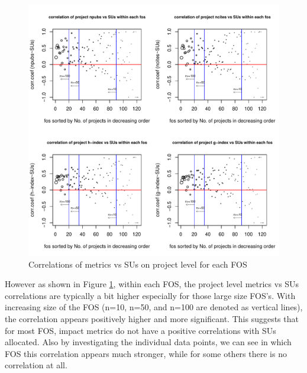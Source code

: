 \documentclass{sig-alternate}
\begin{document}
\begin{figure}[htb] 
  \centering 
    \includegraphics[width=1.0\columnwidth]{images/06_corr_metrics_vs_alloc_proj_by_fos.pdf} 
  \caption{Correlations of metrics vs SUs on project level for each FOS}\label{F:corr-metrics-vs-alloc-proj-by-fos} 
\end{figure} 
 
However as shown in Figure \ref{F:corr-metrics-vs-alloc-proj-by-fos}, within each FOS, the project level metrics vs SUs correlations are typically a bit higher especially for those large size FOS’s. With increasing size of the FOS (n=10, n=50, and n=100 are denoted as vertical lines), the correlation appears positively higher and more significant. This suggests that for most FOS, impact metrics do not have a positive correlations with SUs allocated. Also by investigating the individual data points, we can see in which FOS this correlation appears much stronger, while for some others there is no correlation at all. 
 
 
 
\end{document}
